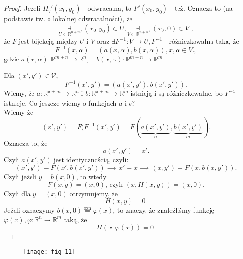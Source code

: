 \documentclass[../main.tex]{subfiles}
\begin{document}
\begin{proof}
    Jeżeli $H_y'(x_0,y_0)$ - odwracalna, to $F'(x_0,y_0)$ - też.
    Oznacza to (na podstawie tw. o lokalnej odwracalności), że
    \[
        \underset{U\subset\mathbb{R}^{n+m}}{\exists},
        (x_0,y_0)\in U, \underset{V\subset\mathbb{R}^{n+m}}{\exists} ,(x_0,0)\in V
    .,\] że $F$ jest bijekcją między $U$ i $V$ oraz $\exists F^{-1}:V\to U, F^{-1}$ - różniczkowalna taka, że
     \[
         F^{-1}(x,\alpha) = (a(x,\alpha),b(x,\alpha)), x,\alpha\in V
     .,\] gdzie $a(x,\alpha): \mathbb{R}^{m+n}\to\mathbb{R}^n,\quad b(x,\alpha):\mathbb{R}^{m+n}\to\mathbb{R}^m  $

    Dla $(x',y')\in \mathcal{V},$
    \[
        F^{-1}(x',y') = (a(x',y'),b(x',y'))
    .\]
    Wiemy, że $a: \mathbb{R}^{n+m}\to\mathbb{R}^{n}$ i $b: \mathbb{R}^{n+m}\to\mathbb{R}^m$ istnieją i są różniczkowalne, bo $F^{-1}$ istnieje. Co jeszcze wiemy o funkcjach $a$ i $b$?\\
    Wiemy że  \[
        (x',y') = F(F^{-1}(x',y') = F(\underbrace{a(x',y')}_{n} , \underbrace{b(x',y')}_{m})
    .\]
    Oznacza to, że
    \[
        a(x',y') = x'
    .\]
    Czyli $a(x',y')$ jest identycznością, czyli:
    \[
        (x',y') = F(x',b(x',y')) \implies x'=x \implies (x,y') = F(x,b(x,y'))
    .\]
    Czyli jeżeli $y=b(x,0)$, to wtedy
    \[
        F(x,y) = (x,0)\text{, czyli } (x,H(x,y)) = (x,0)
    .\]
    Czyli dla $y = (x,0)$ otrzymujemy, że
    \[
        H(x,y)=0
    .\]
    Jeżeli oznaczymy $b(x,0) \overset{\text{ozn}}{=} \varphi(x)$, to znaczy, że znaleźliśmy funkcję $\varphi(x), \varphi:\mathbb{R}^n\to\mathbb{R}^m$ taką, że \[
        H(x,\varphi(x))=0
    .\]

\end{proof}

\begin{figure}[h]
    \centering
    \texttt{[image: fig\_11]}
    \caption{}
    \label{fig:}
\end{figure}
\end{document}

